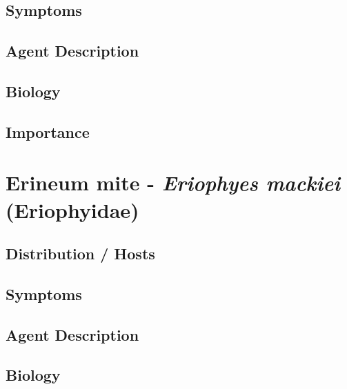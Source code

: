 \documentclass[
]{book}
\begin{document}
\subsection*{Symptoms}\label{symptoms-7}

\subsection*{Agent Description}\label{agent-description-7}

\subsection*{Biology}\label{biology-7}

\subsection*{Importance}\label{importance-7}

\section*{\texorpdfstring{Erineum mite - \emph{Eriophyes mackiei} (Eriophyidae)}{Erineum mite - Eriophyes mackiei (Eriophyidae)}}\label{erineum-mite---eriophyes-mackiei-eriophyidae}

\subsection*{Distribution / Hosts}\label{distribution-hosts-8}

\subsection*{Symptoms}\label{symptoms-8}

\subsection*{Agent Description}\label{agent-description-8}

\subsection*{Biology}\label{biology-8}
\end{document}
